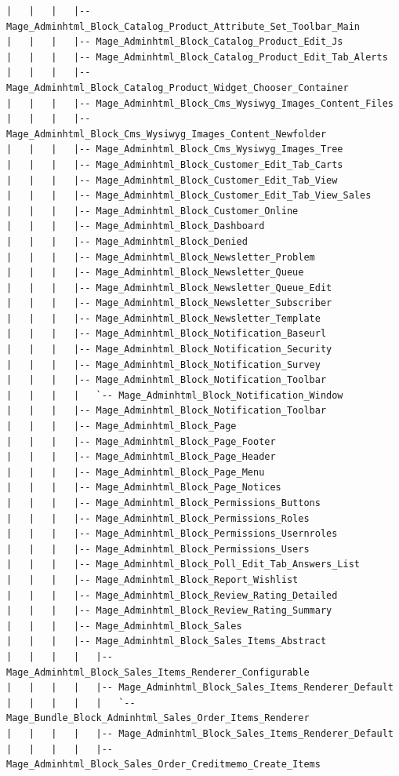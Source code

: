 \documentclass[oneside]{book}
\begin{document}
\begin{lstlisting}
|   |   |   |-- Mage_Adminhtml_Block_Catalog_Product_Attribute_Set_Toolbar_Main
|   |   |   |-- Mage_Adminhtml_Block_Catalog_Product_Edit_Js
|   |   |   |-- Mage_Adminhtml_Block_Catalog_Product_Edit_Tab_Alerts
|   |   |   |-- Mage_Adminhtml_Block_Catalog_Product_Widget_Chooser_Container
|   |   |   |-- Mage_Adminhtml_Block_Cms_Wysiwyg_Images_Content_Files
|   |   |   |-- Mage_Adminhtml_Block_Cms_Wysiwyg_Images_Content_Newfolder
|   |   |   |-- Mage_Adminhtml_Block_Cms_Wysiwyg_Images_Tree
|   |   |   |-- Mage_Adminhtml_Block_Customer_Edit_Tab_Carts
|   |   |   |-- Mage_Adminhtml_Block_Customer_Edit_Tab_View
|   |   |   |-- Mage_Adminhtml_Block_Customer_Edit_Tab_View_Sales
|   |   |   |-- Mage_Adminhtml_Block_Customer_Online
|   |   |   |-- Mage_Adminhtml_Block_Dashboard
|   |   |   |-- Mage_Adminhtml_Block_Denied
|   |   |   |-- Mage_Adminhtml_Block_Newsletter_Problem
|   |   |   |-- Mage_Adminhtml_Block_Newsletter_Queue
|   |   |   |-- Mage_Adminhtml_Block_Newsletter_Queue_Edit
|   |   |   |-- Mage_Adminhtml_Block_Newsletter_Subscriber
|   |   |   |-- Mage_Adminhtml_Block_Newsletter_Template
|   |   |   |-- Mage_Adminhtml_Block_Notification_Baseurl
|   |   |   |-- Mage_Adminhtml_Block_Notification_Security
|   |   |   |-- Mage_Adminhtml_Block_Notification_Survey
|   |   |   |-- Mage_Adminhtml_Block_Notification_Toolbar
|   |   |   |   `-- Mage_Adminhtml_Block_Notification_Window
|   |   |   |-- Mage_Adminhtml_Block_Notification_Toolbar
|   |   |   |-- Mage_Adminhtml_Block_Page
|   |   |   |-- Mage_Adminhtml_Block_Page_Footer
|   |   |   |-- Mage_Adminhtml_Block_Page_Header
|   |   |   |-- Mage_Adminhtml_Block_Page_Menu
|   |   |   |-- Mage_Adminhtml_Block_Page_Notices
|   |   |   |-- Mage_Adminhtml_Block_Permissions_Buttons
|   |   |   |-- Mage_Adminhtml_Block_Permissions_Roles
|   |   |   |-- Mage_Adminhtml_Block_Permissions_Usernroles
|   |   |   |-- Mage_Adminhtml_Block_Permissions_Users
|   |   |   |-- Mage_Adminhtml_Block_Poll_Edit_Tab_Answers_List
|   |   |   |-- Mage_Adminhtml_Block_Report_Wishlist
|   |   |   |-- Mage_Adminhtml_Block_Review_Rating_Detailed
|   |   |   |-- Mage_Adminhtml_Block_Review_Rating_Summary
|   |   |   |-- Mage_Adminhtml_Block_Sales
|   |   |   |-- Mage_Adminhtml_Block_Sales_Items_Abstract
|   |   |   |   |-- Mage_Adminhtml_Block_Sales_Items_Renderer_Configurable
|   |   |   |   |-- Mage_Adminhtml_Block_Sales_Items_Renderer_Default
|   |   |   |   |   `-- Mage_Bundle_Block_Adminhtml_Sales_Order_Items_Renderer
|   |   |   |   |-- Mage_Adminhtml_Block_Sales_Items_Renderer_Default
|   |   |   |   |-- Mage_Adminhtml_Block_Sales_Order_Creditmemo_Create_Items

\end{lstlisting}
\end{document}
